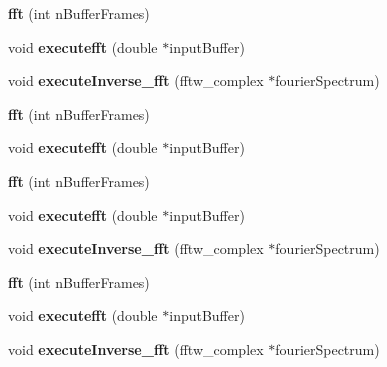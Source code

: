 \begin{DoxyCompactItemize}
\item 
\hypertarget{classfft_a5fff94ac07119207ddd05f628be5891d}{{\bfseries fft} (int n\-Buffer\-Frames)}\label{classfft_a5fff94ac07119207ddd05f628be5891d}

\item 
\hypertarget{classfft_a47e58fd4f715ad89a6fad8df9d715bf4}{void {\bfseries executefft} (double $\ast$input\-Buffer)}\label{classfft_a47e58fd4f715ad89a6fad8df9d715bf4}

\item 
\hypertarget{classfft_a228bd861564c189cd7b6800c950a1c09}{void {\bfseries execute\-Inverse\-\_\-fft} (fftw\-\_\-complex $\ast$fourier\-Spectrum)}\label{classfft_a228bd861564c189cd7b6800c950a1c09}

\item 
\hypertarget{classfft_a5fff94ac07119207ddd05f628be5891d}{{\bfseries fft} (int n\-Buffer\-Frames)}\label{classfft_a5fff94ac07119207ddd05f628be5891d}

\item 
\hypertarget{classfft_a47e58fd4f715ad89a6fad8df9d715bf4}{void {\bfseries executefft} (double $\ast$input\-Buffer)}\label{classfft_a47e58fd4f715ad89a6fad8df9d715bf4}

\item 
\hypertarget{classfft_a5fff94ac07119207ddd05f628be5891d}{{\bfseries fft} (int n\-Buffer\-Frames)}\label{classfft_a5fff94ac07119207ddd05f628be5891d}

\item 
\hypertarget{classfft_a47e58fd4f715ad89a6fad8df9d715bf4}{void {\bfseries executefft} (double $\ast$input\-Buffer)}\label{classfft_a47e58fd4f715ad89a6fad8df9d715bf4}

\item 
\hypertarget{classfft_a228bd861564c189cd7b6800c950a1c09}{void {\bfseries execute\-Inverse\-\_\-fft} (fftw\-\_\-complex $\ast$fourier\-Spectrum)}\label{classfft_a228bd861564c189cd7b6800c950a1c09}

\item 
\hypertarget{classfft_a5fff94ac07119207ddd05f628be5891d}{{\bfseries fft} (int n\-Buffer\-Frames)}\label{classfft_a5fff94ac07119207ddd05f628be5891d}

\item 
\hypertarget{classfft_a47e58fd4f715ad89a6fad8df9d715bf4}{void {\bfseries executefft} (double $\ast$input\-Buffer)}\label{classfft_a47e58fd4f715ad89a6fad8df9d715bf4}

\item 
\hypertarget{classfft_a228bd861564c189cd7b6800c950a1c09}{void {\bfseries execute\-Inverse\-\_\-fft} (fftw\-\_\-complex $\ast$fourier\-Spectrum)}\label{classfft_a228bd861564c189cd7b6800c950a1c09}

\end{DoxyCompactItemize}
